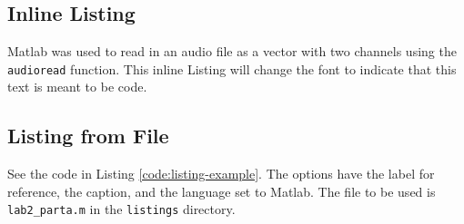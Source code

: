 \subsection{Inline Listing}

Matlab was used to read in an audio file as a vector with two channels using the \lstinline!audioread! function. This inline Listing will change the font to indicate that this text is meant to be code.

\subsection{Listing from File}

See the code in Listing \ref{code:listing-example}. The options have the label for reference, the caption, and the language set to Matlab. The file to be used is \lstinline!lab2_parta.m! in the \lstinline!listings! directory.

\begin{lstlisting}[label=code:listing-example,language=tex]

\end{lstlisting}
